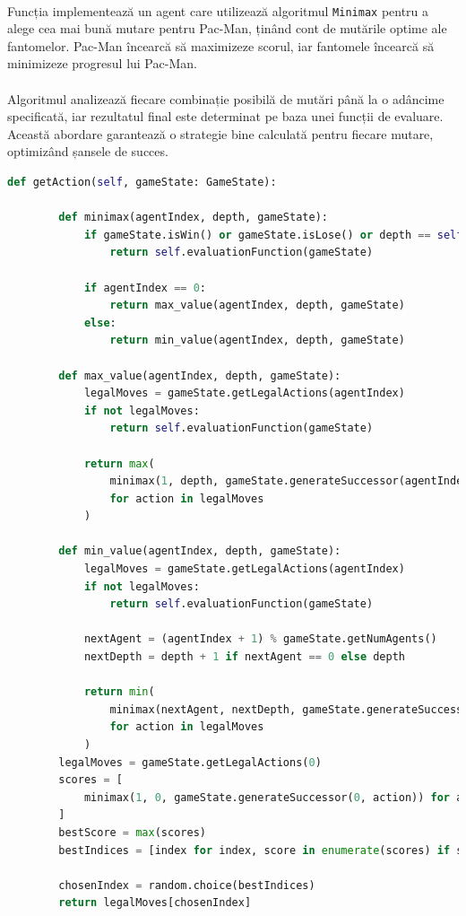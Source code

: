 \documentclass[12pt]{article}
\begin{document}
	\paragraph{}Funcția implementează un agent care utilizează algoritmul \texttt{Minimax} pentru a alege cea mai bună mutare pentru Pac-Man, ținând cont de mutările optime ale fantomelor. Pac-Man încearcă să maximizeze scorul, iar fantomele încearcă să minimizeze progresul lui Pac-Man. \paragraph{}Algoritmul analizează fiecare combinație posibilă de mutări până la o adâncime specificată, iar rezultatul final este determinat pe baza unei funcții de evaluare. Această abordare garantează o strategie bine calculată pentru fiecare mutare, optimizând șansele de succes.
	\begin{lstlisting}[language=Python]
    def getAction(self, gameState: GameState):

        def minimax(agentIndex, depth, gameState):
            if gameState.isWin() or gameState.isLose() or depth == self.depth:
                return self.evaluationFunction(gameState)

            if agentIndex == 0:
                return max_value(agentIndex, depth, gameState)
            else:
                return min_value(agentIndex, depth, gameState)

        def max_value(agentIndex, depth, gameState):
            legalMoves = gameState.getLegalActions(agentIndex)
            if not legalMoves:
                return self.evaluationFunction(gameState)

            return max(
                minimax(1, depth, gameState.generateSuccessor(agentIndex, action))
                for action in legalMoves
            )

        def min_value(agentIndex, depth, gameState):
            legalMoves = gameState.getLegalActions(agentIndex)
            if not legalMoves:
                return self.evaluationFunction(gameState)

            nextAgent = (agentIndex + 1) % gameState.getNumAgents()
            nextDepth = depth + 1 if nextAgent == 0 else depth

            return min(
                minimax(nextAgent, nextDepth, gameState.generateSuccessor(agentIndex, action))
                for action in legalMoves
            )
        legalMoves = gameState.getLegalActions(0)
        scores = [
            minimax(1, 0, gameState.generateSuccessor(0, action)) for action in legalMoves
        ]
        bestScore = max(scores)
        bestIndices = [index for index, score in enumerate(scores) if score == bestScore]

        chosenIndex = random.choice(bestIndices)
        return legalMoves[chosenIndex]
    \end{lstlisting}
\newpage
\end{document}

